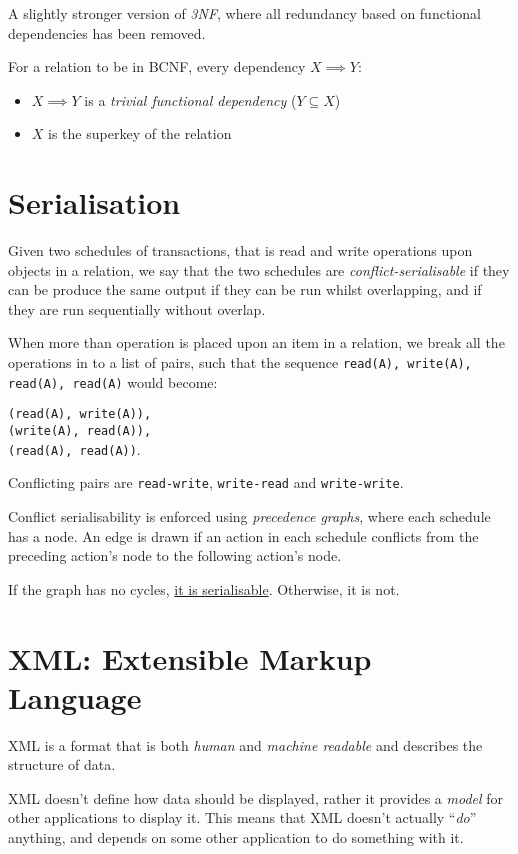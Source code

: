 \documentclass{article}
\begin{document}
A slightly stronger version of \textit{3NF}, where all redundancy based on functional dependencies has been removed.

For a relation to be in BCNF, every dependency $X \implies Y$:

\begin{itemize}
\item 
  $X \implies Y$ is a \textit{trivial functional dependency} ($Y \subseteq X$)
\item
  $X$ is the superkey of the relation
\end{itemize}

\section{Serialisation}

Given two schedules of transactions, that is read and write operations upon objects in a relation, we say that the two schedules are \textit{conflict-serialisable} if they can be produce the same output if they can be run whilst overlapping, and if they are run sequentially without overlap.

When more than operation is placed upon an item in a relation, we break all the operations in to a list of pairs, such that the sequence \texttt{read(A), write(A), read(A), read(A)} would become:

\texttt{(read(A), write(A)),\\ (write(A), read(A)),\\ (read(A), read(A))}.

Conflicting pairs are \texttt{read-write}, \texttt{write-read} and \texttt{write-write}. 

Conflict serialisability is enforced using \textit{precedence graphs}, where each schedule has a node. An edge is drawn if an action in each schedule conflicts from the preceding action's node to the following action's node.

If the graph has no cycles, \underline{it is serialisable}. Otherwise, it is not.

\filbreak
\section{XML: Extensible Markup Language}

XML is a format that is both \textit{human} and \textit{machine readable} and describes the structure of data.

XML doesn't define how data should be displayed, rather it provides a \textit{model} for other applications to display it. This means that XML doesn't actually ``\textit{do}'' anything, and depends on some other application to do something with it.
\end{document}
